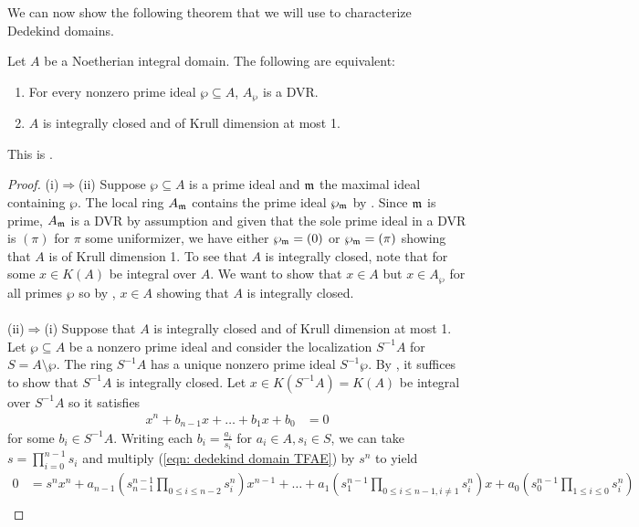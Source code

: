 We can now show the following theorem that we will use to characterize Dedekind domains. 
\begin{theorem}\label{thm: dedekind TFAE}
  Let $A$ be a Noetherian integral domain. The following are equivalent:
  \begin{enumerate}[label=(\roman*)]
    \item For every nonzero prime ideal $\wp\subseteq A$, $A_{\wp}$ is a DVR. 
    \item $A$ is integrally closed and of Krull dimension at most 1. 
  \end{enumerate}
\end{theorem}
This is \cite[Ch. 1, \S 1, Prop. 4]{Serre}. 
\begin{proof}
  (i)$\Longrightarrow$(ii) Suppose $\wp\subseteq A$ is a prime ideal and $\mathfrak{m}$ the maximal ideal containing $\wp$. The local ring $A_{\mathfrak{m}}$ contains the prime ideal $\wp_{\mathfrak{m}}$ by . Since $\mathfrak{m}$ is prime, $A_{\mathfrak{m}}$ is a DVR by assumption and given that the sole prime ideal in a DVR is $(\pi)$ for $\pi$ some uniformizer, we have either $\wp_{\mathfrak{m}}=(0)$ or $\wp_{\mathfrak{m}}=(\pi)$ showing that $A$ is of Krull dimension 1. To see that $A$ is integrally closed, note that for some $x\in K(A)$ be integral over $A$. We want to show that $x\in A$ but $x\in A_{\wp}$ for all primes $\wp$ so by , $x\in A$ showing that $A$ is integrally closed. 
  \\\\
  (ii)$\Longrightarrow$(i) Suppose that $A$ is integrally closed and of Krull dimension at most 1. Let $\wp\subseteq A$ be a nonzero prime ideal and consider the localization $S^{-1}A$ for $S=A\setminus\wp$. The ring $S^{-1}A$ has a unique nonzero prime ideal $S^{-1}\wp$. By , it suffices to show that $S^{-1}A$ is integrally closed. Let $x\in K(S^{-1}A)=K(A)$ be integral over $S^{-1}A$ so it satisfies
  \begin{align}\label{eqn: dedekind domain TFAE}
    x^{n}+b_{n-1}x+\dots+b_{1}x+b_{0} &= 0
  \end{align}
  for some $b_{i}\in S^{-1}A$. Writing each $b_{i}=\frac{a_{i}}{s_{i}}$ for $a_{i}\in A, s_{i}\in S$, we can take $s=\prod_{i=0}^{n-1}s_{i}$ and multiply (\ref{eqn: dedekind domain TFAE}) by $s^{n}$ to yield 
  \small
  \begin{align*}
    0 &= s^{n}x^{n}+a_{n-1}\left(s_{n-1}^{n-1}\prod_{0\leq i\leq n-2}s_{i}^{n}\right)x^{n-1}+\dots+a_{1}\left(s_{1}^{n-1}\prod_{0\leq i\leq n-1, i\neq 1}s_{i}^{n}\right)x+a_{0}\left(s_{0}^{n-1}\prod_{1\leq i\leq 0}s_{i}^{n}\right) \\

\end{align*}
\end{proof}
